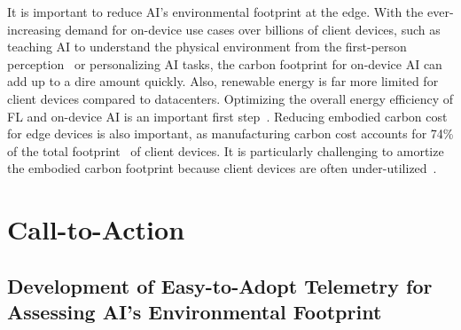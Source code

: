 It is important to reduce AI's environmental footprint at the edge. With the ever-increasing demand for on-device use cases over billions of client devices, such as teaching AI to understand the physical environment from the first-person perception~\cite{grauman:2021:ego4d} or personalizing AI tasks, the carbon footprint for on-device AI can add up to a dire amount quickly. Also, renewable energy is far more limited for client devices compared to datacenters.
%
Optimizing the overall energy efficiency of FL and on-device AI is an important first step~\cite{kim:micro:2021,kang:asplos:2017,kim:micro:2020,yang:arxiv:2017,Stamoulis:iccad:2018}. Reducing embodied carbon cost for edge devices is also important, as 
manufacturing carbon cost accounts for 74\% of the total footprint~\cite{Gupta:HPCA:2021} of client devices.
It is particularly challenging to amortize the embodied carbon footprint because client devices are often under-utilized~\cite{gao:ispass:2015}. 
%
%




\section{Call-to-Action}

\subsection{Development of Easy-to-Adopt Telemetry for Assessing AI's Environmental Footprint}
\label{sec:metrics}

